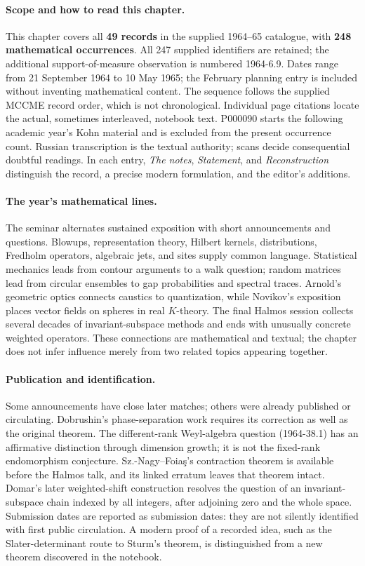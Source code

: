 \nocite{*}
\paragraph{Scope and how to read this chapter.}
This chapter covers all \textbf{49 records} in the supplied 1964--65
catalogue, with \textbf{248 mathematical occurrences}.  All 247 supplied
identifiers are retained; the additional support-of-measure observation
is numbered 1964-6.9.  Dates range from
21 September 1964 to 10 May 1965; the February planning entry is included
without inventing mathematical content.  The sequence follows the supplied
MCCME record order, which is not chronological.  Individual page citations
locate the actual, sometimes interleaved, notebook text.  P000090 starts the
following academic year's Kohn material and is excluded from the present
occurrence count.  Russian transcription is the textual authority; scans
decide consequential doubtful readings.  In each entry, \emph{The notes},
\emph{Statement}, and \emph{Reconstruction} distinguish the record, a precise
modern formulation, and the editor's additions.

\paragraph{The year's mathematical lines.}
The seminar alternates sustained exposition with short announcements and
questions.  Blowups, representation theory, Hilbert kernels, distributions,
Fredholm operators, algebraic jets, and sites supply common language.
Statistical mechanics leads from contour arguments to a walk question;
random matrices lead from circular ensembles to gap probabilities and
spectral traces.  Arnold's geometric optics connects caustics to quantization,
while Novikov's exposition places vector fields on spheres in real
\(K\)-theory.  The final Halmos session collects several decades of
invariant-subspace methods and ends with unusually concrete weighted
operators.  These connections are mathematical and textual; the chapter does
not infer influence merely from two related topics appearing together.

\paragraph{Publication and identification.}
Some announcements have close later matches; others were already published
or circulating.  Dobrushin's phase-separation work requires its correction
as well as the original theorem.  The different-rank Weyl-algebra question
(1964-38.1) has an affirmative distinction through dimension growth; it is
not the fixed-rank endomorphism conjecture.  Sz.-Nagy--Foia\c{s}'s contraction
theorem is available before the Halmos talk, and its linked erratum leaves
that theorem intact.  Domar's later weighted-shift construction resolves the
question of an invariant-subspace chain indexed by all integers, after
adjoining zero and the whole space.  Submission dates are reported as submission dates:
they are not silently identified with first public circulation.  A modern
proof of a recorded idea, such as the Slater-determinant route to Sturm's
theorem, is distinguished from a new theorem discovered in the notebook.

